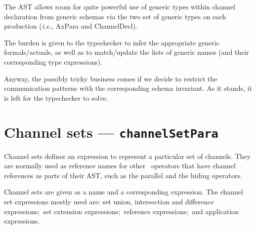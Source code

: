 \documentclass{article}
\newcommand{\grammar}[1]{\texttt{#1}}
\newcommand{\code}[1]{\textsf{#1}}
\begin{document}
%
\begin{issue}
   The AST allows room for quite powerful use of generic types within channel
   declaration from generic schemas via the two set of generic types on each
   production (\textit{i.e.}, \code{AxPara} and \code{ChannelDecl}).

   The burden is given to the typechecker to infer the appropriate generic
   formals/actuals, as well as to match/update the lists of generic names (and
   their corresponding type expressions).

   Anyway, the possibly tricky business comes if we decide to restrict the
   communication patterns with the corresponding schema invariant. As it
   stands, it is left for the typechecker to solve.
\end{issue}

\section{Channel sets --- \grammar{channelSetPara}}

Channel sets defines an expression to represent a particular set of channels.
They are normally used as reference names for other \Circus\ operators that
have channel references as parts of their AST, such as the parallel and the
hiding operators.

Channel sets are given as a name and a corresponding expression.
%
%
The channel set expressions mostly used are: set union, intersection and
difference expressions;~set extension expressions;~reference expressions;~and
application expressions.
\end{document}
